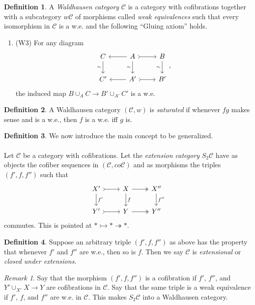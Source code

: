 \documentclass[10pt,letterpaper,cm]{nupset}
\theoremstyle{definition}
\newtheorem{definition}{Definition}
\theoremstyle{theorem}
\theoremstyle{remark}
\newtheorem{remark}{Remark}
\newcommand{\1}{\mathbf{1}}
\renewcommand{\c}{\mathscr{C}}
\newcommand{\0}{\vec 0}
\begin{document}
\begin{definition}
A \textit{Waldhausen category} $\c$ is a category with cofibrations together with a subcategory $w\c$ of morphisms called \textit{weak equivalences} such that every isomorphism in $\c$ is a w.e. and the following ``Gluing axiom'' holds.
\begin{enumerate}
\item (W3) For any diagram
\[
\begin{tikzcd}
C \arrow[d, "\sim"'] & A \arrow[d, "\sim"'] \arrow[r, tail] \arrow[l] & B \arrow[d, "\sim"'] \\
C' & A' \arrow[r, tail] \arrow[l] & B'
\end{tikzcd}, \]
the induced map $B \cup_A C \to  B' \cup_{A'} C'$ is a w.e.
\end{enumerate}
\end{definition}

\begin{definition}
A Waldhausen category $(\c, w)$ is \textit{saturated} if whenever $fg$ makes sense and is a w.e., then $f$ is a w.e. iff $g$ is. 
\end{definition}

\begin{definition}
We now introduce the main concept to be generalized.
\\ \\ Let $\c$ be a category with cofibrations. Let the \textit{extension category} $S_2\c$ have as objects the cofiber sequences in $(\c, co\c)$ and as morphisms the triples $(f', f, f'')$ such that
\[
\begin{tikzcd}
X' \arrow[r, tail] \arrow[d, "f'"] & X \arrow[r, two heads] \arrow[d, "f"] & X'' \arrow[d, "f''"] \\
Y' \arrow[r, tail] & Y \arrow[r, two heads] & Y''
\end{tikzcd}
\] 
commutes. This is pointed at $\ast \rightarrowtail \ast \twoheadrightarrow \ast$.
\end{definition}

\begin{definition}
Suppose an arbitrary triple $(f', f, f'')$ as above has the property that whenever $f'$ and $f''$ are w.e., then so is $f$. Then we say $\c$ is \textit{extensional} or \textit{closed under extensions}.
\end{definition}

\begin{remark}
Say that the morphism $(f', f, f'')$ is a cofibration if $f'$, $f''$, and $Y' \cup_{X'} X \to Y$ are cofibrations in $\c$. Say that  the same triple is a weak equivalence if $f'$, $f$, and $f''$ are w.e. in $\c$. This makes $S_2 \c$ into a Waldhausen category.
\end{remark}
\end{document}

